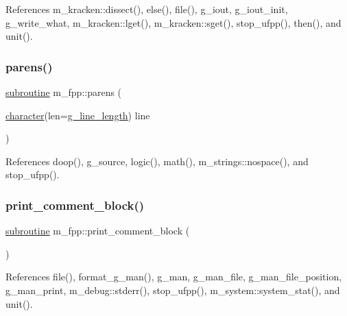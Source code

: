 References m\+\_\+kracken\+::dissect(), else(), file(), g\+\_\+iout, g\+\_\+iout\+\_\+init, g\+\_\+write\+\_\+what, m\+\_\+kracken\+::lget(), m\+\_\+kracken\+::sget(), stop\+\_\+ufpp(), then(), and unit().

\mbox{\label{namespacem__fpp_a4b9be76f637b58b358ee2a9ec95db933}} 
\subsubsection{\texorpdfstring{parens()}{parens()}}
{\footnotesize\ttfamily \hyperlink{M__stopwatch_83_8txt_acfbcff50169d691ff02d4a123ed70482}{subroutine} m\+\_\+fpp\+::parens (\begin{DoxyParamCaption}\item[{\hyperlink{option__stopwatch_83_8txt_abd4b21fbbd175834027b5224bfe97e66}{character}(len=\hyperlink{namespacem__fpp_ab93f8756cf248cf8db932573009d4664}{g\+\_\+line\+\_\+length})}]{line }\end{DoxyParamCaption})}



References doop(), g\+\_\+source, logic(), math(), m\+\_\+strings\+::nospace(), and stop\+\_\+ufpp().

\mbox{\label{namespacem__fpp_a27e4c26021feb655e915c1835e40e8f4}} 
\subsubsection{\texorpdfstring{print\+\_\+comment\+\_\+block()}{print\_comment\_block()}}
{\footnotesize\ttfamily \hyperlink{M__stopwatch_83_8txt_acfbcff50169d691ff02d4a123ed70482}{subroutine} m\+\_\+fpp\+::print\+\_\+comment\+\_\+block (\begin{DoxyParamCaption}{ }\end{DoxyParamCaption})}



References file(), format\+\_\+g\+\_\+man(), g\+\_\+man, g\+\_\+man\+\_\+file, g\+\_\+man\+\_\+file\+\_\+position, g\+\_\+man\+\_\+print, m\+\_\+debug\+::stderr(), stop\+\_\+ufpp(), m\+\_\+system\+::system\+\_\+stat(), and unit().

\mbox{\label{namespacem__fpp_a8034546d38694c17677cf638e2760d43}} 
